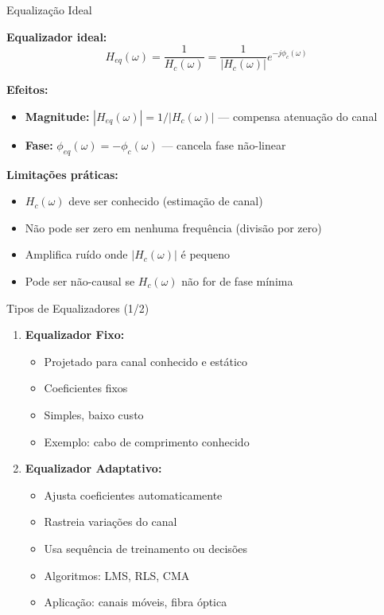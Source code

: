\begin{frame}{Equalização Ideal}

\textbf{Equalizador ideal:}
\vspace{-2mm}
\[
H_{eq}(\omega) = \frac{1}{H_c(\omega)} = \frac{1}{|H_c(\omega)|} e^{-j\phi_c(\omega)}
\]
\vspace{-4mm}

\textbf{Efeitos:}
\begin{itemize}
\item \textbf{Magnitude:} $|H_{eq}(\omega)| = 1/|H_c(\omega)|$ --- compensa atenuação do canal
\item \textbf{Fase:} $\phi_{eq}(\omega) = -\phi_c(\omega)$ --- cancela fase não-linear
\end{itemize}

\textbf{Limitações práticas:}
\begin{itemize}
\item $H_c(\omega)$ deve ser conhecido (estimação de canal)
\item Não pode ser zero em nenhuma frequência (divisão por zero)
\item Amplifica ruído onde $|H_c(\omega)|$ é pequeno
\item Pode ser não-causal se $H_c(\omega)$ não for de fase mínima
\end{itemize}

\end{frame}


\begin{frame}{Tipos de Equalizadores (1/2)}

\begin{enumerate}
\item \textbf{Equalizador Fixo:}
   \begin{itemize}
   \item Projetado para canal conhecido e estático
   \item Coeficientes fixos
   \item Simples, baixo custo
   \item Exemplo: cabo de comprimento conhecido
   \end{itemize}

\item \textbf{Equalizador Adaptativo:}
   \begin{itemize}
   \item Ajusta coeficientes automaticamente
   \item Rastreia variações do canal
   \item Usa sequência de treinamento ou decisões
   \item Algoritmos: LMS, RLS, CMA
   \item Aplicação: canais móveis, fibra óptica
   \end{itemize}
\end{enumerate}

\end{frame}

